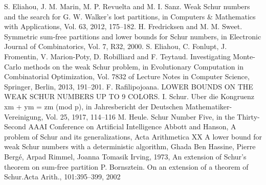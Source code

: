 \documentclass{report}
\begin{document}
\begin{thebibliography}{}
 S. Eliahou, J. M. Marin, M. P. Revuelta and M. I. Sanz. Weak Schur numbers and the search for G. W. Walker’s lost partitions, in Computers & Mathematics with Applications, Vol. 63, 2012, 175–182.
 H. Fredricksen and M. M. Sweet. Symmetric sum-free partitions and lower bounds for Schur numbers, in Electronic Journal of Combinatorics, Vol. 7, R32, 2000.
  S. Eliahou, C. Fonlupt, J. Fromentin, V. Marion-Poty, D. Robilliard and F. Teytaud. Investigating Monte-Carlo methods on the weak Schur problem, in Evolutionary Computation in Combinatorial Optimization, Vol. 7832 of Lecture Notes in Computer Science, Springer, Berlin, 2013, 191–201.
 F. Rafilipojoana. LOWER BOUNDS ON THE WEAK SCHUR NUMBERS UP TO 9 COLORS.
  I. Schur. Uber die Kongruenz xm + ym = zm (mod p), in Jahresbericht der Deutschen Mathematiker-Vereinigung, Vol. 25, 1917, 114–116
 M. Heule. Schur Number Five, in the Thirty-Second AAAI Conference on Artificial Intelligence 
 Abbott and Hanson, A problem of Schur and its generalizations, Acta Arithmetica XX
 A lower bound for weak Schur numbers with a deterministic algorithm, Ghada Ben Hassine, Pierre Bergé, Arpad Rimmel, Joanna Tomasik
 Irving, 1973, An extension of Schur’s theorem on sum-free partition
 P. Bornsztein. On an extension of a theorem of Schur.Acta Arith., 101:395–399, 2002
\end{thebibliography}
\end{document}
